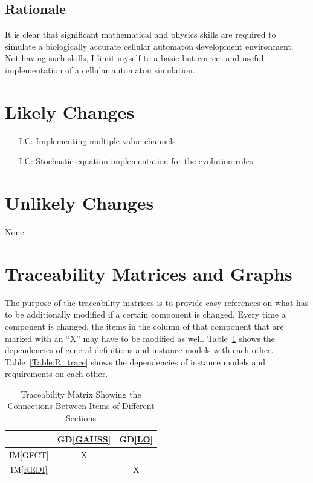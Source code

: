 \documentclass[12pt]{article}
\newcommand{\dref}[1]{GD\ref{#1}}
\newcommand{\iref}[1]{IM\ref{#1}}
\newcounter{lcnum} %
\begin{document}
\subsection{Rationale}

It is clear that significant mathematical and physics skills are required to simulate a biologically accurate cellular automaton development environment. 
Not having such skills, I limit myself to a basic but correct and useful implementation of a cellular automaton simulation.

\section{Likely Changes}    

\noindent \begin{itemize}

\item[LC\refstepcounter{lcnum}\thelcnum\label{LC_meaningfulLabel}:] Implementing multiple value channels

\item[LC\refstepcounter{lcnum}\thelcnum\label{LC_meaningfulLabel}:] Stochastic equation implementation for the evolution rules
\end{itemize}

\section{Unlikely Changes}    

None

\section{Traceability Matrices and Graphs}

The purpose of the traceability matrices is to provide easy references on what
has to be additionally modified if a certain component is changed.  Every time a
component is changed, the items in the column of that component that are marked
with an ``X'' may have to be modified as well.  Table~\ref{Table:trace} shows the
dependencies of  general definitions and instance models with each other. 
Table~\ref{Table:R_trace} shows the dependencies of instance models and requirements on each other. 

\begin{table}[h!]
\centering
\begin{tabular}{|c|c|c|}
\hline        
	& \dref{GAUSS} & \dref{LO} \\
\hline
\iref{GFCT} & X &  \\ \hline
\iref{REDI} &   & X \\
\hline
\end{tabular}
\caption{Traceability Matrix Showing the Connections Between Items of Different Sections}
\label{Table:trace}
\end{table}
\end{document}
